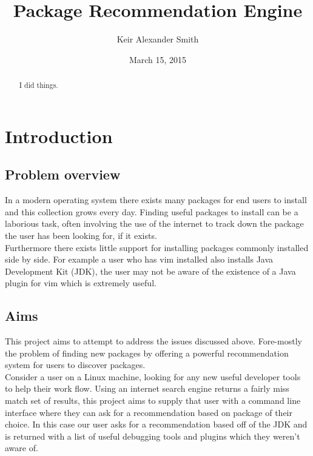 \documentclass{l4proj}
\begin{document}
\title{Package Recommendation Engine}
\author{Keir Alexander Smith}
\date{March 15, 2015}
\maketitle
 
\begin{abstract}
I did things.
\end{abstract}
 
\tableofcontents
 
 
\chapter{Introduction}
 
\section{Problem overview}
In a modern operating system there exists many packages for end users to install and this collection grows every day. Finding useful packages to install can be a laborious task, often involving the use of the internet to track down the package the user has been looking for, if it exists.\\
Furthermore there exists little support for installing packages commonly installed side by side. For example a user who has vim installed also installs Java Development Kit (JDK), the user may not be aware of the existence of a Java plugin for vim which is extremely useful.
 
\section{Aims}
This project aims to attempt to address the issues discussed above. Fore-mostly the problem of finding new packages by offering a powerful recommendation system for users to discover packages.\\
Consider a user on a Linux machine, looking for any new useful developer tools to help their work flow. Using an internet search engine returns a fairly miss match set of results, this project aims to supply that user with a command line interface where they can ask for a recommendation based on package of their choice. In this case our user asks for a recommendation based off of the JDK and is returned with a list of useful debugging tools and plugins which they weren't aware of.
 
\end{document}
